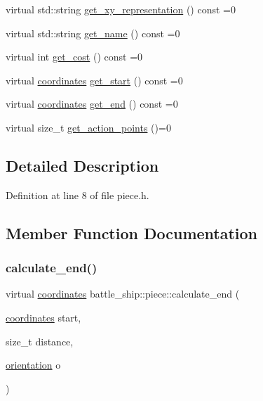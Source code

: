 \begin{DoxyCompactItemize}
\item 
virtual std\+::string \hyperlink{classbattle__ship_1_1piece_ad589faff3ce07b5130bfdd89da4269c1}{get\+\_\+xy\+\_\+representation} () const =0
\item 
virtual std\+::string \hyperlink{classbattle__ship_1_1piece_a95531d660360ffc403a742db1b4f6413}{get\+\_\+name} () const =0
\item 
virtual int \hyperlink{classbattle__ship_1_1piece_a9193782bce8a697bd5d3cb391d5f1623}{get\+\_\+cost} () const =0
\item 
virtual \hyperlink{structbattle__ship_1_1coordinates}{coordinates} \hyperlink{classbattle__ship_1_1piece_ab5010cea30b96f5afc758b2a9d0d43bc}{get\+\_\+start} () const =0
\item 
virtual \hyperlink{structbattle__ship_1_1coordinates}{coordinates} \hyperlink{classbattle__ship_1_1piece_a4f7ac17a3ba66f104d2c5110e0fe51d4}{get\+\_\+end} () const =0
\item 
virtual size\+\_\+t \hyperlink{classbattle__ship_1_1piece_a63f00d666a65cd41a11b592d55411b7f}{get\+\_\+action\+\_\+points} ()=0
\end{DoxyCompactItemize}


\subsection{Detailed Description}


Definition at line 8 of file piece.\+h.



\subsection{Member Function Documentation}
\mbox{\label{classbattle__ship_1_1piece_a58092f7b1d663471204d7e51e68bbb2d}} 
\subsubsection{\texorpdfstring{calculate\+\_\+end()}{calculate\_end()}}
{\footnotesize\ttfamily virtual \hyperlink{structbattle__ship_1_1coordinates}{coordinates} battle\+\_\+ship\+::piece\+::calculate\+\_\+end (\begin{DoxyParamCaption}\item[{\hyperlink{structbattle__ship_1_1coordinates}{coordinates}}]{start,  }\item[{size\+\_\+t}]{distance,  }\item[{\hyperlink{namespacebattle__ship_aed87488f0a73f0d0679fe343fb61c784}{orientation}}]{o }\end{DoxyParamCaption})\hspace{0.3cm}{\ttfamily [pure virtual]}}



